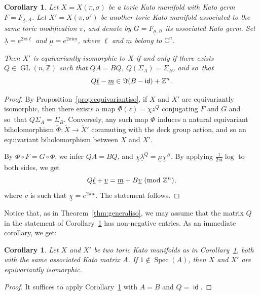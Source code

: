\documentclass[JEP,XML,SOM,Unicode,NoFloatCountersInSection]{cedram}
\newtheorem{corollary}[theorem]{Corollary}
\theoremstyle{definition}
\let\la\lambda
\let\un\underline
\newcommand{\CC}{\mathbb{C}}
\newcommand{\ZZ}{\mathbb{Z}}
\newcommand{\ui}{\mathfrak{i}}
\DeclareMathOperator{\GL}{GL}
\DeclareMathOperator{\id}{\mathsf{id}}
\DeclareMathOperator{\Spec}{Spec}
\begin{document}
\begin{corollary}\label{cor:condiso}
Let $X=X(\pi,\sigma)$ be a toric Kato manifold with Kato germ $F=F_{\un\la,A}$.
Let $X'=X(\pi,\sigma')$ be another toric Kato manifold associated to the same toric modification $\pi$, and denote by $G=F_{\un\mu,B}$ its associated Kato germ.
Set $\un\lambda = e^{2 \pi \ui \un\ell}$ and $\un\mu = e^{2 \pi \ui \un m}$, where $\un\ell$ and $\un m$ belong to $\CC^n$.

Then $X'$ is equivariantly isomorphic to $X$ if and only if there exists $Q \in \GL(n,\ZZ)$ such that $QA=BQ$, $Q(\Sigma_A)=\Sigma_B$, and so~that\vspace*{-3pt}
\begin{equation}\label{eqn:condiso}
Q\un{\ell}-\un{m} \in \Im(B-\id) + \ZZ^n\text.
\end{equation}
\end{corollary}
\begin{proof}
By Proposition~\ref{prop:equivariantiso}, if $X$ and $X'$ are equivariantly isomorphic, then there exists a map $\Phi(z)=\un\chi z^Q$ conjugating $F$ and $G$ and so~that $Q\Sigma_A=\Sigma_B$. Conversely, any such map $\Phi$ induces a natural equivariant biholomorphism $\tilde\Phi:\tilde X\to \tilde X'$ commuting with the deck group action, and so an equivariant biholomorphism between $X$ and $X'$.

By $\Phi \circ F= G \circ \Phi$, we infer $QA=BQ$, and $\un{\chi} \un{\lambda}^{Q} = \un{\mu} \un{\chi}^{B}$.
By applying $\frac{1}{2 \pi \ui} \log$ to both sides, we get\vspace*{-3pt}
\[
Q\un{\ell} + \un{v} = \un{m} + B \un{v} \ (\textrm{mod}\ \ZZ^n)\text,
\]
where $\un{v}$ is such that $\un{\chi}=e^{2 \pi \ui \un{v}}$.
The statement follows.
\end{proof}

Notice that, as in Theorem~\ref{thm:generaliso}, we may assume that the matrix $Q$ in the statement of Corollary~\ref{cor:condiso} has non-negative entries.
As an immediate corollary, we get:

\begin{corollary}
Let $X$ and $X'$ be two toric Kato manifolds as in Corollary~\ref{cor:condiso}, both with the same associated Kato matrix $A$.
If $1 \not \in \Spec(A)$, then $X$ and $X'$ are equivariantly isomorphic.
\end{corollary}
\begin{proof}
It suffices to apply Corollary~\ref{cor:condiso} with $A=B$ and $Q=\id$.
\end{proof}
\end{document}
